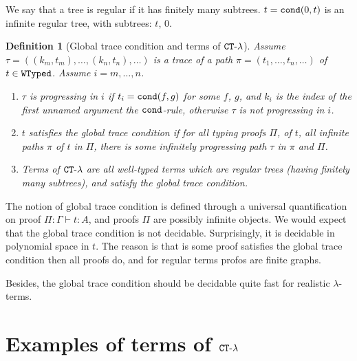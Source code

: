 \documentclass{article}
\newtheorem{definition}[theorem]{Definition}
\begin{document}
We say that a tree is regular if it has finitely many subtrees. $t={\tt cond}(0,t)$ is an infinite regular tree,
with subtrees: $t$, $0$.

\begin{definition}[Global trace condition and terms of ${ {\tt CT} \mbox{-} \lambda}$]
Assume $\tau =( (k_m,t_m), \ldots, (k_n,t_n), \ldots)$ 
is a trace of a path $\pi = (t_1, \ldots, t_n, \ldots)$ of $t \in {\tt WTyped}$. Assume $i=m,\ldots, n$.
\begin{enumerate}
\item
$\tau$ is progressing in $i$ if $t_i={\tt cond}(f,g)$ for some $f$, $g$,
and $k_i$ is the index of the first \emph{unnamed} argument the ${\tt cond}$-rule, 
otherwise $\tau$ is not progressing in $i$.

\item
$t$ satisfies the global trace condition if for all typing proofs $\Pi$,
of $t$, all infinite paths $\pi$ of $t$ in $\Pi$,
there is some infinitely progressing path $\tau$ in $\pi$ and $\Pi$.

\item
Terms of ${ {\tt CT} \mbox{-} \lambda}$ are all well-typed terms which are regular trees (having finitely many subtrees), 
and satisfy the global trace condition.

\end{enumerate}
\end{definition}

The notion of global trace condition is defined through a universal quantification on proof 
$\Pi:\Gamma \vdash t:A$, and proofs $\Pi$ are possibly infinite objects.
We would expect that the global trace condition is not decidable. 
Surprisingly, it is decidable in polynomial space in $t$. The reason is that is some proof satisfies
the global trace condition then all proofs do, and for regular terms profos are finite graphs.

Besides, the global trace condition should be decidable quite fast
for realistic $\lambda$-terms.


\section{Examples of terms of ${ {\tt CT} \mbox{-} \lambda}$}
\end{document}
